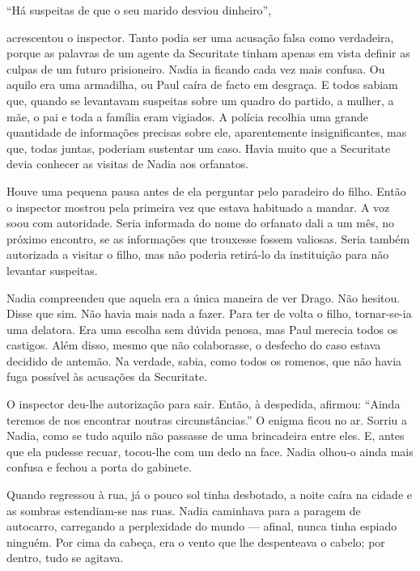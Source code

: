 ``Há suspeitas de que o seu marido desviou dinheiro'',

acrescentou o inspector. Tanto podia ser uma acusação falsa como
verdadeira, porque as palavras de um agente da Securitate tinham apenas
em vista definir as culpas de um futuro prisioneiro. Nadia ia ficando
cada vez mais confusa. Ou aquilo era uma armadilha, ou Paul caíra de
facto em desgraça. E todos sabiam que, quando se levantavam suspeitas
sobre um quadro do partido, a mulher, a
mãe, o pai e toda a família eram vigiados. A polícia recolhia uma
grande quantidade de informações precisas sobre ele, aparentemente
insignificantes, mas que, todas juntas, poderiam sustentar um caso.
Havia muito que a Securitate devia conhecer as visitas de Nadia aos
orfanatos.

Houve uma pequena pausa antes de ela perguntar pelo paradeiro do filho.
Então o inspector mostrou pela primeira vez que estava habituado a
mandar. A voz soou com autoridade. Seria informada do nome do orfanato
dali a um mês, no próximo encontro, se as informações que trouxesse
fossem valiosas. Seria também autorizada a visitar o filho, mas não
poderia retirá-lo da instituição para não levantar suspeitas.

Nadia compreendeu que aquela era a única maneira de ver Drago. Não
hesitou. Disse que sim. Não havia mais nada a fazer. Para ter de volta o
filho, tornar-se-ia uma delatora. Era uma escolha sem dúvida penosa, mas
Paul merecia todos os castigos. Além disso, mesmo que não colaborasse, o
desfecho do caso estava decidido de antemão. Na verdade, sabia, como
todos os romenos, que não havia fuga possível às acusações da
Securitate.

O inspector deu-lhe autorização para sair. Então, à despedida,
afirmou: ``Ainda teremos de nos encontrar noutras circunstâncias.'' O
enigma ficou no ar. Sorriu a Nadia, como se tudo aquilo não passasse de
uma brincadeira entre eles. E, antes que ela pudesse recuar, tocou-lhe
com um dedo na face. Nadia olhou-o ainda mais confusa e fechou a porta
do gabinete.

Quando regressou à rua, já o pouco sol tinha desbotado, a noite caíra
na cidade e as sombras estendiam-se nas
ruas. Nadia caminhava para a paragem de autocarro, carregando a
perplexidade do mundo --- afinal, nunca tinha espiado ninguém. Por cima
da cabeça, era o vento que lhe despenteava o cabelo; por dentro, tudo se
agitava.

